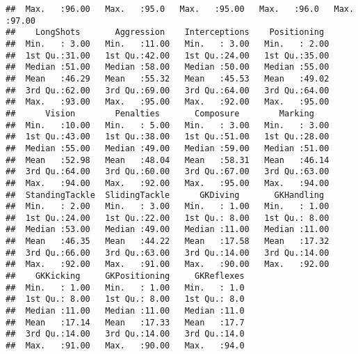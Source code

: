 \documentclass[
]{article}
\begin{document}
\begin{verbatim}
##  Max.   :96.00   Max.   :95.0   Max.   :95.00   Max.   :96.0   Max.   :97.00  
##    LongShots       Aggression    Interceptions    Positioning   
##  Min.   : 3.00   Min.   :11.00   Min.   : 3.00   Min.   : 2.00  
##  1st Qu.:31.00   1st Qu.:42.00   1st Qu.:24.00   1st Qu.:35.00  
##  Median :51.00   Median :58.00   Median :50.00   Median :55.00  
##  Mean   :46.29   Mean   :55.32   Mean   :45.53   Mean   :49.02  
##  3rd Qu.:62.00   3rd Qu.:69.00   3rd Qu.:64.00   3rd Qu.:64.00  
##  Max.   :93.00   Max.   :95.00   Max.   :92.00   Max.   :95.00  
##      Vision        Penalties       Composure        Marking     
##  Min.   :10.00   Min.   : 5.00   Min.   : 3.00   Min.   : 3.00  
##  1st Qu.:43.00   1st Qu.:38.00   1st Qu.:51.00   1st Qu.:28.00  
##  Median :55.00   Median :49.00   Median :59.00   Median :51.00  
##  Mean   :52.98   Mean   :48.04   Mean   :58.31   Mean   :46.14  
##  3rd Qu.:64.00   3rd Qu.:60.00   3rd Qu.:67.00   3rd Qu.:63.00  
##  Max.   :94.00   Max.   :92.00   Max.   :95.00   Max.   :94.00  
##  StandingTackle  SlidingTackle      GKDiving       GKHandling   
##  Min.   : 2.00   Min.   : 3.00   Min.   : 1.00   Min.   : 1.00  
##  1st Qu.:24.00   1st Qu.:22.00   1st Qu.: 8.00   1st Qu.: 8.00  
##  Median :53.00   Median :49.00   Median :11.00   Median :11.00  
##  Mean   :46.35   Mean   :44.22   Mean   :17.58   Mean   :17.32  
##  3rd Qu.:66.00   3rd Qu.:63.00   3rd Qu.:14.00   3rd Qu.:14.00  
##  Max.   :92.00   Max.   :91.00   Max.   :90.00   Max.   :92.00  
##    GKKicking     GKPositioning     GKReflexes  
##  Min.   : 1.00   Min.   : 1.00   Min.   : 1.0  
##  1st Qu.: 8.00   1st Qu.: 8.00   1st Qu.: 8.0  
##  Median :11.00   Median :11.00   Median :11.0  
##  Mean   :17.14   Mean   :17.33   Mean   :17.7  
##  3rd Qu.:14.00   3rd Qu.:14.00   3rd Qu.:14.0  
##  Max.   :91.00   Max.   :90.00   Max.   :94.0
\end{verbatim}
\end{document}
